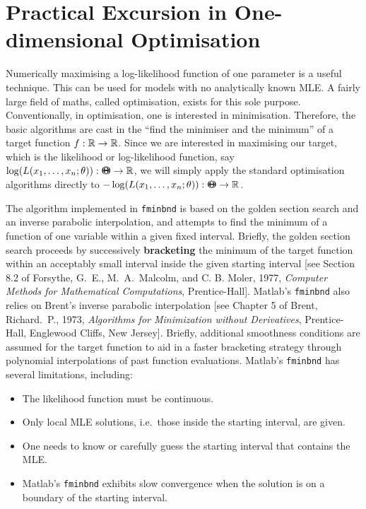 \section{Practical Excursion in One-dimensional Optimisation}
Numerically maximising a log-likelihood function of one parameter is a useful technique.  This can be used for models with no analytically known MLE.  A fairly large field of maths, called optimisation, exists for this sole purpose.  Conventionally, in optimisation, one is interested in minimisation.  Therefore, the basic algorithms are cast in the ``find the minimiser and the minimum'' of a target function $f:\mathbb{R} \to \mathbb{R}$.  Since we are interested in maximising our target, which is the likelihood or log-likelihood function, say $\log(L(x_1,\ldots,x_n; \theta)): {\Theta}\mspace{-11 mu}{\Theta} \to \mathbb{R}$, we will simply apply the standard optimisation algorithms directly to $-\log(L(x_1,\ldots,x_n; \theta)):{\Theta}\mspace{-11 mu}{\Theta}\to \mathbb{R}$.

The algorithm implemented in {\tt fminbnd} is based on the golden section search and an inverse parabolic interpolation, and attempts to find the minimum of a function of one variable within a given fixed interval.  Briefly, the golden section search proceeds by successively {\bf bracketing} the minimum of the target function within an acceptably small interval inside the given starting interval [see Section 8.2 of Forsythe, G.~E., M.~A.~Malcolm, and C. B. Moler, 1977, {\em Computer Methods for Mathematical Computations}, Prentice-Hall].  {\sc Matlab}'s {\tt fminbnd} also relies on Brent's inverse parabolic interpolation [see Chapter 5 of Brent, Richard.~P., 1973, {\em Algorithms for Minimization without Derivatives}, Prentice-Hall, Englewood Cliffs, New Jersey].  Briefly, additional smoothness conditions are assumed for the target function to aid in a faster bracketing strategy through polynomial interpolations of past function evaluations.  {\sc Matlab}'s {\tt fminbnd} has several limitations, including:
\begin{itemize}
\item The likelihood function must be continuous. 
\item Only local MLE solutions, i.e.~those inside the starting interval, are given.
\item One needs to know or carefully guess the starting interval that contains the MLE.
\item {\sc Matlab}'s {\tt fminbnd} exhibits slow convergence when the solution is on a boundary of the starting interval.
\end{itemize}

